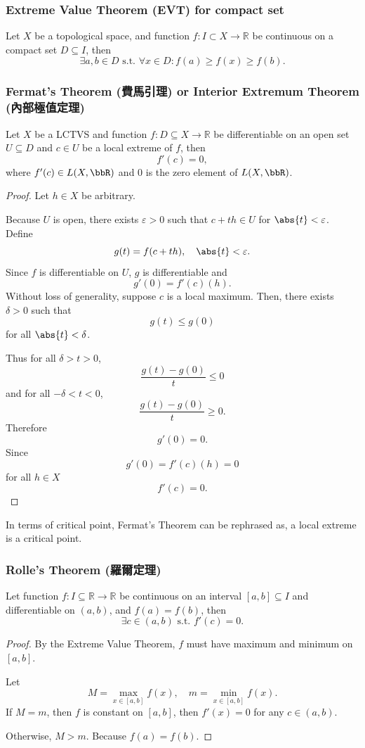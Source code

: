 \documentclass[a4paper,12pt]{report}
\begin{document}
\begin{itemize}
\begin{itemize}
\subsubsection{Extreme Value Theorem (EVT) for compact set}
Let $X$ be a topological space, and function $f\colon I\subset X\to\mathbb{R}$ be continuous on a compact set $D\subseteq I$, then
\[\exists a,b \in D \text{\ s.t.\ }\forall x \in D\colon f(a)\geq f(x)\geq f(b).\]
\subsubsection{Fermat's Theorem (費馬引理) or Interior Extremum Theorem (內部極值定理)}
Let $X$ be a LCTVS and function $f\colon D\subseteq X\to\mathbb{R}$ be differentiable on an open set $U\subseteq D$ and $c\in U$ be a local extreme of $f$, then
\[f'(c)=0,\]
where $f'(c)\in L(X,\bbR)$ and $0$ is the zero element of $L(X,\bbR)$.
\begin{proof}
Let $h\in X$ be arbitrary.

Because $U$ is open, there exists $\varepsilon>0$ such that $c+th\in U$ for $\abs{t}<\varepsilon$. Define
\[g(t)=f(c+th),\quad\abs{t}<\varepsilon.\]
Since $f$ is differentiable on $U$, $g$ is differentiable and
\[g'(0)=f'(c)(h).\]
Without loss of generality, suppose $c$ is a local maximum. Then, there exists $\delta>0$ such that
\[g(t)\leq g(0)\]
for all $\abs{t}<\delta$.

Thus for all $\delta>t>0$,
\[\frac{g(t)-g(0)}{t}\leq 0\]
and for all $-\delta<t<0$,
\[\frac{g(t)-g(0)}{t}\geq 0.\]
Therefore
\[g'(0)=0.\]
Since
\[g'(0)=f'(c)(h)=0\]
for all $h\in X$
\[f'(c)=0.\]
\end{proof}
In terms of critical point, Fermat's Theorem can be rephrased as, a local extreme is a critical point.
\subsubsection{Rolle's Theorem (羅爾定理)}
Let function $f\colon I\subseteq\mathbb{R}\to\mathbb{R}$ be continuous on an interval $[a, b]\subseteq I$ and differentiable on $(a,b)$, and $f(a)=f(b)$, then
\[\exists c\in (a, b)\text{\ s.t.\ }f'(c)=0.\]
\begin{proof}
By the Extreme Value Theorem, $f$ must have maximum and minimum on $[a,b]$.

Let
\[M=\max_{x\in [a,b]}f(x),\quad m=\min_{x\in [a,b]}f(x).\]
If $M=m$, then $f$ is constant on $[a,b]$, then $f'(x)=0$ for any $c\in (a,b)$.

Otherwise, $M>m$. Because $f(a)=f(b)$. 


\end{proof}
\end{itemize}
\end{itemize}
\end{document}
